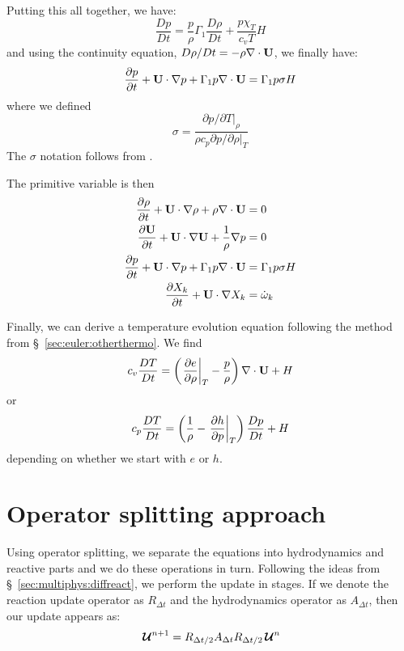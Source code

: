 Putting this all together, we have:
\begin{equation}
\frac{Dp}{Dt} = \frac{p}{\rho}\Gamma_1  \frac{D\rho}{Dt}
   + \frac{p \chi_T}{c_v T} H
\end{equation}
and using the continuity equation, $D\rho/Dt = -\rho \nabla \cdot {\bf U}$, 
we finally have:
\begin{equation}
\label{eq:reacting:p}
{\frac{{\partial p}}{\partial t}} + {\bf U} \cdot \nabla p + \Gamma_1 p \nabla \cdot {\bf U} = \Gamma_1 p \sigma H
\end{equation}
where we defined
\begin{equation}
\sigma = \frac{\partial p/\partial T |_\rho}{\rho c_p \partial p/\partial \rho |_T}
\end{equation}
The $\sigma$ notation follows from \cite{ABRZ:II}.

The primitive variable is then
\begin{align}
{\frac{{\partial\rho}}{\partial t}} + {\bf U} \cdot \nabla \rho + \rho \nabla \cdot {\bf U} &= 0\\
{\frac{{\partial{\bf U}}}{\partial t}} + {\bf U} \cdot\nabla {\bf U} + \frac{1}{\rho} \nabla p &= 0\\
{\frac{{\partial p}}{\partial t}} + {\bf U} \cdot \nabla p + \Gamma_1 p \nabla \cdot {\bf U} &= \Gamma_1 p \sigma H \\
{\frac{{\partial X_k}}{\partial t}} + {\bf U} \cdot \nabla {X_k} &= {\dot{\omega}}_k 
\end{align}

Finally, we can derive a temperature evolution equation following the 
method from \S~\ref{sec:euler:otherthermo}.  We find
\begin{equation}
c_v {\frac{{DT}}{D t}} = \left ( \left . \frac{\partial e}{\partial \rho} \right |_T - \frac{p}{\rho} \right ) \nabla \cdot {\bf U}
  + H
\end{equation}
or
\begin{equation}
c_p {\frac{{DT}}{D t}} = \left ( \frac{1}{\rho} - \left . \frac{\partial h}{\partial p} \right |_T \right ) {\frac{{Dp}}{D t}}
 + H
\end{equation}
depending on whether we start with $e$ or $h$.  


\section{Operator splitting approach}

Using operator splitting, we separate the equations into hydrodynamics
and reactive parts and we do these operations in turn.  Following the
ideas from \S~\ref{sec:multiphys:diffreact}, we perform the update
in stages.  If we denote the reaction update operator as $R_{\Delta t}$
and the hydrodynamics operator as $A_{\Delta t}$, then our update 
appears as:
\begin{equation}
  {\,\boldsymbol{\mathcal{U}}}^{n+1} = R_{\Delta t/2} A_{\Delta t} R_{\Delta t/2} {\,\boldsymbol{\mathcal{U}}}^n
\end{equation}


